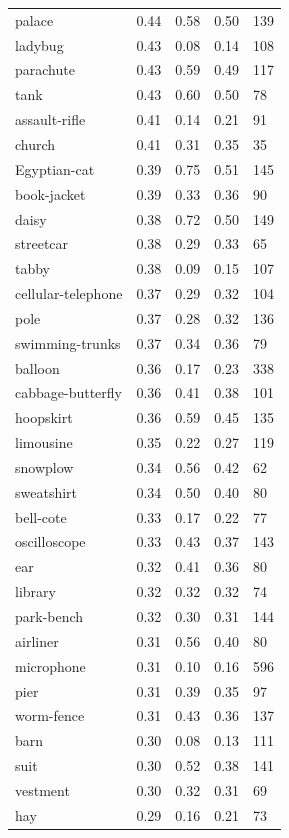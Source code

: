 \begin{center}
\begin{longtable}{lllll}
palace & 0.44 & 0.58 & 0.50 & 139 \\
ladybug & 0.43 & 0.08 & 0.14 & 108 \\
parachute & 0.43 & 0.59 & 0.49 & 117 \\
tank & 0.43 & 0.60 & 0.50 & 78 \\
assault-rifle & 0.41 & 0.14 & 0.21 & 91 \\
church & 0.41 & 0.31 & 0.35 & 35 \\
Egyptian-cat & 0.39 & 0.75 & 0.51 & 145 \\
book-jacket & 0.39 & 0.33 & 0.36 & 90 \\
daisy & 0.38 & 0.72 & 0.50 & 149 \\
streetcar & 0.38 & 0.29 & 0.33 & 65 \\
tabby & 0.38 & 0.09 & 0.15 & 107 \\
cellular-telephone & 0.37 & 0.29 & 0.32 & 104 \\
pole & 0.37 & 0.28 & 0.32 & 136 \\
swimming-trunks & 0.37 & 0.34 & 0.36 & 79 \\
balloon & 0.36 & 0.17 & 0.23 & 338 \\
cabbage-butterfly & 0.36 & 0.41 & 0.38 & 101 \\
hoopskirt & 0.36 & 0.59 & 0.45 & 135 \\
limousine & 0.35 & 0.22 & 0.27 & 119 \\
snowplow & 0.34 & 0.56 & 0.42 & 62 \\
sweatshirt & 0.34 & 0.50 & 0.40 & 80 \\
bell-cote & 0.33 & 0.17 & 0.22 & 77 \\
oscilloscope & 0.33 & 0.43 & 0.37 & 143 \\
ear & 0.32 & 0.41 & 0.36 & 80 \\
library & 0.32 & 0.32 & 0.32 & 74 \\
park-bench & 0.32 & 0.30 & 0.31 & 144 \\
airliner & 0.31 & 0.56 & 0.40 & 80 \\
microphone & 0.31 & 0.10 & 0.16 & 596 \\
pier & 0.31 & 0.39 & 0.35 & 97 \\
worm-fence & 0.31 & 0.43 & 0.36 & 137 \\
barn & 0.30 & 0.08 & 0.13 & 111 \\
suit & 0.30 & 0.52 & 0.38 & 141 \\
vestment & 0.30 & 0.32 & 0.31 & 69 \\
hay & 0.29 & 0.16 & 0.21 & 73 \\

\end{longtable}
\end{center}
